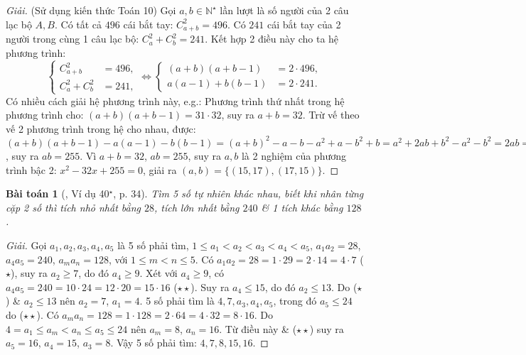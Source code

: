 \documentclass{article}
\numberwithin{equation}{section}
\newtheorem{baitoan}{Bài toán}[section]
\begin{document}
\begin{proof}[Giải]
	(Sử dụng kiến thức Toán 10) Gọi $a,b\in\mathbb{N}^\star$ lần lượt là số người của 2 câu lạc bộ $A,B$. Có tất cả $496$ cái bắt tay: $C_{a+b}^2 = 496$. Có $241$ cái bắt tay của 2 người trong cùng 1 câu lạc bộ: $C_a^2 + C_b^2 = 241$. Kết hợp 2 điều này cho ta hệ phương trình:
	\begin{equation*}
		\left\{\begin{split}
			C_{a+b}^2 &= 496,\\
			C_a^2 + C_b^2 &= 241,
		\end{split}\right.\Leftrightarrow\left\{\begin{split}
			(a + b)(a + b - 1) &= 2\cdot 496,\\
			a(a - 1) + b(b - 1) &= 2\cdot 241.
		\end{split}\right.
	\end{equation*}
	Có nhiều cách giải hệ phương trình này, e.g.: Phương trình thứ nhất trong hệ phương trình cho: $(a + b)(a + b - 1) = 31\cdot 32$, suy ra $a + b = 32$. Trừ vế theo vế 2 phương trình trong hệ cho nhau, được: $(a + b)(a + b - 1) - a(a - 1) - b(b - 1) = (a + b)^2 - a - b - a^2 + a - b^2 + b = a^2 + 2ab + b^2 - a^2 - b^2 = 2ab = 2\cdot496 - 2\cdot241 = 510$, suy ra $ab = 255$. Vì $a + b = 32$, $ab = 255$, suy ra $a,b$ là 2 nghiệm của phương trình bậc 2: $x^2 - 32x + 255 = 0$, giải ra $(a,b) = \{(15,17),(17,15)\}$.
\end{proof}

\begin{baitoan}[\cite{Binh_Toan_6_tap_1}, Ví dụ 40${}^\star$, p. 34]
	Tìm 5 số tự nhiên khác nhau, biết khi nhân từng cặp 2 số thì tích nhỏ nhất bằng $28$, tích lớn nhất bằng $240$ \& 1 tích khác bằng $128$.
\end{baitoan}

\begin{proof}[Giải]
	Gọi $a_1,a_2,a_3,a_4,a_5$ là 5 số phải tìm, $1\le a_1 < a_2 < a_3 < a_4 < a_5$, $a_1a_2 = 28$, $a_4a_5 = 240$, $a_ma_n = 128$, với $1\le m < n\le 5$. Có $a_1a_2 = 28 = 1\cdot 29 = 2\cdot 14 = 4\cdot 7$ ($\star$), suy ra $a_2\ge 7$, do đó $a_4\ge 9$. Xét với $a_4\ge 9$, có $a_4a_5 = 240 = 10\cdot 24 = 12\cdot 20 = 15\cdot 16$ ($\star\star$). Suy ra $a_4\le 15$, do đó $a_2\le 13$. Do ($\star$) \& $a_2\le 13$ nên $a_2 = 7$, $a_1 = 4$. 5 số phải tìm là $4,7,a_3,a_4,a_5$, trong đó $a_5\le 24$ do ($\star\star$). Có $a_ma_n = 128 = 1\cdot 128 = 2\cdot 64 = 4\cdot 32 = 8\cdot 16$. Do $4 = a_1\le a_m < a_n\le a_5\le 24$ nên $a_m = 8$, $a_n = 16$. Từ điều này \& ($\star\star$) suy ra $a_5 = 16$, $a_4 = 15$, $a_3 = 8$. Vậy 5 số phải tìm: $4,7,8,15,16$.
\end{proof}
\end{document}
